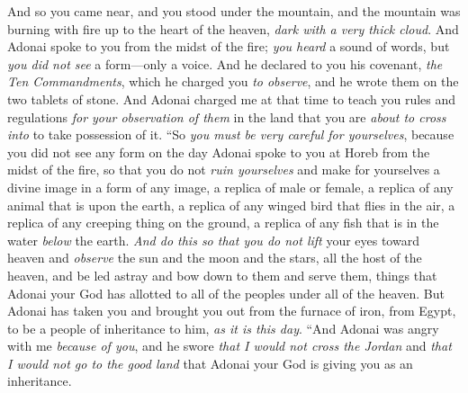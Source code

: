 \begin{biblechapter}
\verse And so you came near, and you stood under the mountain, and the mountain was burning with fire up to the heart of the heaven, \textit{dark with a very thick cloud}.
\verse And Adonai spoke to you from the midst of the fire; \textit{you heard} a sound of words, but \textit{you did not see} a form—only a voice.
\verse And he declared to you his covenant, \textit{the Ten Commandments}, which he charged you \textit{to observe}, and he wrote them on the two tablets of stone.
\verse And Adonai charged me at that time to teach you rules and regulations \textit{for your observation of them} in the land that you are \textit{about to cross into} to take possession of it.
\verse “So \textit{you must be very careful for yourselves}, because you did not see any form on the day Adonai spoke to you at Horeb from the midst of the fire,
\verse so that you do not \textit{ruin yourselves} and make for yourselves a divine image in a form of any image, a replica of male or female,
\verse a replica of any animal that is upon the earth, a replica of any winged bird that flies in the air,
\verse a replica of any creeping thing on the ground, a replica of any fish that is in the water \textit{below} the earth.
\verse \textit{And do this so that you do not lift} your eyes toward heaven and \textit{observe} the sun and the moon and the stars, all the host of the heaven, and be led astray and bow down to them and serve them, things that Adonai your God has allotted to all of the peoples under all of the heaven.
\verse But Adonai has taken you and brought you out from the furnace of iron, from Egypt, to be a people of inheritance to him, \textit{as it is this day}.
\verse “And Adonai was angry with me \textit{because of you}, and he swore \textit{that I would not cross the Jordan} and \textit{that I would not go to the good land} that Adonai your God is giving you as an inheritance.

\end{biblechapter}
